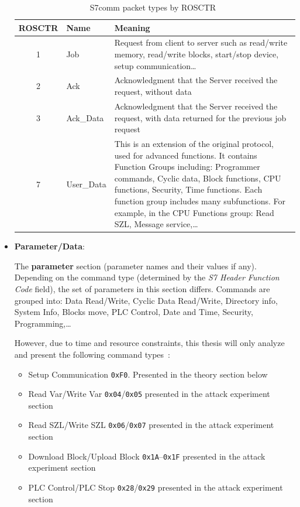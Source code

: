 \documentclass[../main.tex]{subfiles}
\begin{document}
\begin{itemize}
\begin{table}[H]
    \centering
    \caption{S7comm packet types by ROSCTR~\cite{snap7_s7protocol,gmiru_s7comm_part1}}
    \label{tab:rosctr}
    \footnotesize
    \begin{tabular}{|c|l|p{8.5cm}|}
        \hline
        \textbf{ROSCTR} & \textbf{Name} & \textbf{Meaning} \\
        \hline
        1 & Job & Request from client to server such as read/write memory, read/write blocks, start/stop device, setup communication\ldots \\
        \hline
        2 & Ack & Acknowledgment that the Server received the request, without data \\
        \hline
        3 & Ack\_Data & Acknowledgment that the Server received the request, with data returned for the previous job request \\
        \hline
        7 & User\_Data & This is an extension of the original protocol, used for advanced functions. It contains Function Groups including: Programmer commands, Cyclic data, Block functions, CPU functions, Security, Time functions. Each function group includes many subfunctions. For example, in the CPU Functions group: Read SZL, Message service,\ldots \\
        \hline
    \end{tabular}
\end{table}

\item \textbf{Parameter/Data}:

The \textbf{parameter} section (parameter names and their values if any). Depending on the command type (determined by the \textit{S7 Header Function Code} field), the set of parameters in this section differs. Commands are grouped into: Data Read/Write, Cyclic Data Read/Write, Directory info, System Info, Blocks move, PLC Control, Date and Time, Security, Programming,\ldots

However, due to time and resource constraints, this thesis will only analyze and present the following command types~\cite{gmiru_s7comm_part2}:

\begin{itemize}

\item Setup Communication \texttt{0xF0}. Presented in the theory section below
\item Read Var/Write Var \texttt{0x04}/\texttt{0x05} presented in the attack experiment section
\item Read SZL/Write SZL \texttt{0x06}/\texttt{0x07} presented in the attack experiment section
\item Download Block/Upload Block \texttt{0x1A}--\texttt{0x1F} presented in the attack experiment section
\item PLC Control/PLC Stop \texttt{0x28}/\texttt{0x29} presented in the attack experiment section


\end{itemize}
\end{itemize}
\end{document}
